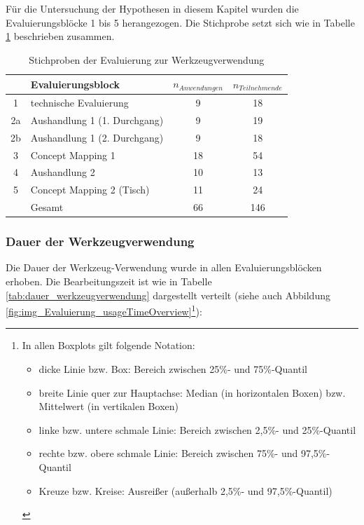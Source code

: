 Für die Untersuchung der Hypothesen in diesem Kapitel wurden die Evaluierungsblöcke 1 bis 5 herangezogen. Die Stichprobe setzt sich wie in Tabelle \ref{tab:stichprobe_tui} beschrieben zusammen.

\begin{table}[htbp]
	\centering
	\caption{Stichproben der Evaluierung zur Werkzeugverwendung}

		\begin{tabular}{| c | l || c | c |}
		\hline
			& Evaluierungsblock & $n_{Anwendungen}$ & $n_{Teilnehmende}$ \\ \hline
			1 & technische Evaluierung		  &  9 & 18 \\
			2a & Aushandlung 1 (1. Durchgang)  &  9 & 19 \\
			2b & Aushandlung 1 (2. Durchgang)  &  9 & 18 \\
			3 & Concept Mapping 1			  & 18 & 54 \\
			4 & Aushandlung 2				  & 10 & 13 \\
			5 & Concept Mapping 2 (Tisch)     & 11 & 24 \\  \hline
			& Gesamt						  & 66 & 146 \\ \hline
	\end{tabular}
	\label{tab:stichprobe_tui}
\end{table}

\subsubsection{Dauer der Werkzeugverwendung} %

Die Dauer der Werkzeug-Verwendung wurde in allen Evaluierungsblöcken erhoben. Die Bearbeitungszeit ist wie in Tabelle \ref{tab:dauer_werkzeugverwendung} dargestellt verteilt (siehe auch Abbildung \ref{fig:img_Evaluierung_usageTimeOverview}\footnote{In allen Boxplots gilt folgende Notation: 
\begin{itemize}
	\item dicke Linie bzw. Box: Bereich zwischen 25\%- und 75\%-Quantil
	\item breite Linie quer zur Hauptachse: Median (in horizontalen Boxen) bzw. Mittelwert (in vertikalen Boxen)
	\item linke bzw. untere schmale Linie: Bereich zwischen 2,5\%- und 25\%-Quantil
	\item rechte bzw. obere schmale Linie: Bereich zwischen 75\%- und 97,5\%-Quantil
	\item Kreuze bzw. Kreise: Ausreißer (außerhalb 2,5\%- und 97,5\%-Quantil)
\end{itemize}
}):


